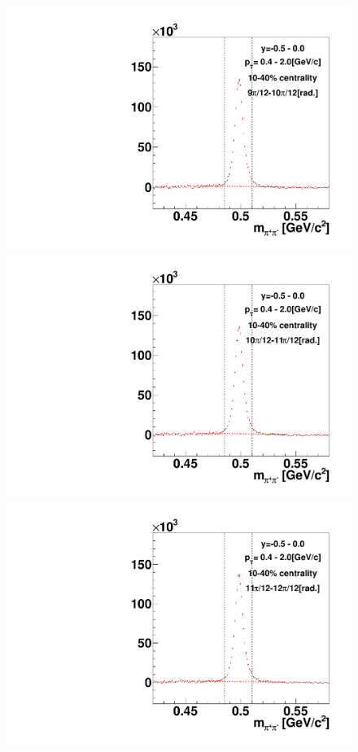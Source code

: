 \begin{figure}[h]
\includegraphics[width=0.14\linewidth]{chapterX/fig/ks_v2_sig/kf_ptslice0_cent1_ks_flow_phi10_rap1.pdf}
\includegraphics[width=0.14\linewidth]{chapterX/fig/ks_v2_sig/kf_ptslice0_cent1_ks_flow_phi11_rap1.pdf}
\includegraphics[width=0.14\linewidth]{chapterX/fig/ks_v2_sig/kf_ptslice0_cent1_ks_flow_phi12_rap1.pdf}


\end{figure}
